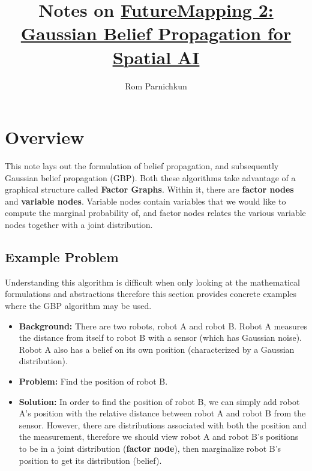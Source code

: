 \documentclass[twocolumn]{article}
\begin{document}
\title{Notes on \href{https://arxiv.org/pdf/1910.14139.pdf}{FutureMapping 2: Gaussian Belief Propagation for Spatial AI}}
\author{Rom Parnichkun}

\maketitle

\section{Overview}

This note lays out the formulation of belief propagation, and subsequently Gaussian belief propagation (GBP). Both these algorithms take advantage of a graphical structure called \textbf{Factor Graphs}. Within it, there are \textbf{factor nodes} and \textbf{variable nodes}. Variable nodes contain variables that we would like to compute the marginal probability of, and factor nodes relates the various variable nodes together with a joint distribution.

\subsection{Example Problem}

Understanding this algorithm is difficult when only looking at the mathematical formulations and abstractions therefore this section provides concrete examples where the GBP algorithm may be used.

\begin{itemize}
    \item \textbf{Background:} There are two robots, robot A and robot B. Robot A measures the distance from itself to robot B with a sensor (which has Gaussian noise). Robot A also has a belief on its own position (characterized by a Gaussian distribution).
    \item \textbf{Problem:} Find the position of robot B.
    \item \textbf{Solution:} In order to find the position of robot B, we can simply add robot A's position with the relative distance between robot A and robot B from the sensor. However, there are distributions associated with both the position and the measurement, therefore we should view robot A and robot B's positions to be in a joint distribution (\textbf{factor node}), then marginalize robot B's position to get its distribution (belief).
\end{itemize}
\end{document}
